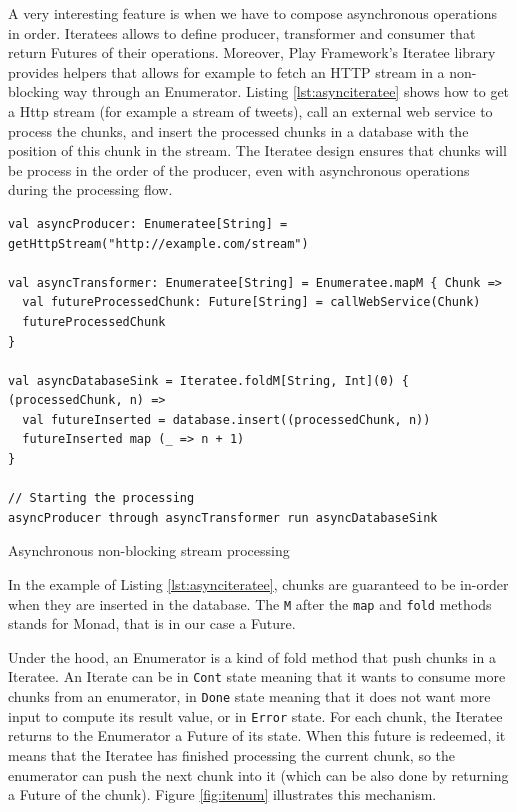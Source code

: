 A very interesting feature is when we have to compose asynchronous operations in order. Iteratees allows to define
producer, transformer and consumer that return Futures of their operations. Moreover, Play Framework's Iteratee library
provides helpers that allows for example to fetch an HTTP stream in a non-blocking way through an Enumerator.
Listing \ref{lst:asynciteratee} shows how to get a Http stream (for example a stream of tweets), call an external web service to process
the chunks, and insert the processed chunks in a database with the position of this chunk in the stream. 
The Iteratee design ensures that chunks will be process in the order of the producer, even with asynchronous
operations during the processing flow.

\begin{listing}[h]
\begin{verbatim}
val asyncProducer: Enumeratee[String] = getHttpStream("http://example.com/stream")

val asyncTransformer: Enumeratee[String] = Enumeratee.mapM { Chunk => 
  val futureProcessedChunk: Future[String] = callWebService(Chunk)
  futureProcessedChunk
}

val asyncDatabaseSink = Iteratee.foldM[String, Int](0) { (processedChunk, n) =>
  val futureInserted = database.insert((processedChunk, n))
  futureInserted map (_ => n + 1)
}

// Starting the processing
asyncProducer through asyncTransformer run asyncDatabaseSink
\end{verbatim}
\caption{Asynchronous non-blocking stream processing}
\label{lst:asynciteratee}
\end{listing}

In the example of Listing \ref{lst:asynciteratee}, chunks are guaranteed to be in-order when they are inserted in the database. The \verb|M| after
the \verb|map| and \verb|fold| methods stands for Monad, that is in our case a Future.

Under the hood, an Enumerator is a kind of fold method that push chunks in a Iteratee. An Iterate can be in \verb|Cont| state meaning that it wants to consume more 
chunks from an enumerator, in \verb|Done| state
meaning that it does not want more input to compute its result value, or in \verb|Error| state. For each chunk, the Iteratee returns to the Enumerator
a Future of its state. When this future is redeemed, it means that the Iteratee has finished processing the current chunk, so the enumerator can 
push the next chunk into it (which can be also done by returning a Future of the chunk). Figure \ref{fig:itenum} illustrates this mechanism.

